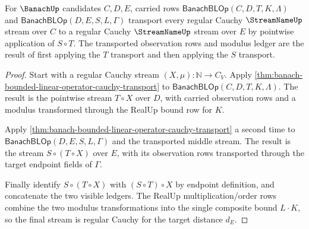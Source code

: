 \begin{theorem}
\label{thm:banach-bounded-linear-operator-composition-cauchy-transport}
For $\BanachUp$ candidates $C,D,E$, carried rows
$\mathsf{BanachBLOp}(C,D,T,K,\Lambda)$ and
$\mathsf{BanachBLOp}(D,E,S,L,\Gamma)$ transport every regular Cauchy
$\StreamNameUp$ stream over $C$ to a regular Cauchy $\StreamNameUp$ stream
over $E$ by pointwise application of $S\circ T$. The transported observation
rows and modulus ledger are the result of first applying the $T$ transport
and then applying the $S$ transport.
\end{theorem}
\begin{proof}
Start with a regular Cauchy stream $(X,\mu):\mathbb{N}\to C_V$. Apply
\autoref{thm:banach-bounded-linear-operator-cauchy-transport} to
$\mathsf{BanachBLOp}(C,D,T,K,\Lambda)$. The result is the pointwise stream
$T\circ X$ over $D$, with carried observation rows and a modulus transformed
through the RealUp bound row for $K$.

Apply \autoref{thm:banach-bounded-linear-operator-cauchy-transport} a second
time to $\mathsf{BanachBLOp}(D,E,S,L,\Gamma)$ and the transported middle
stream. The result is the stream $S\circ(T\circ X)$ over $E$, with its
observation rows transported through the target endpoint fields of
$\Gamma$.

Finally identify $S\circ(T\circ X)$ with $(S\circ T)\circ X$ by endpoint
definition, and concatenate the two visible ledgers. The RealUp
multiplication/order rows combine the two modulus transformations into the
single composite bound $L\cdot K$, so the final stream is regular Cauchy for
the target distance $d_E$.
\end{proof}

